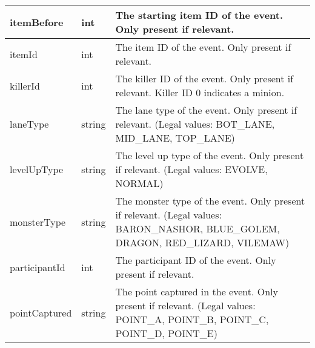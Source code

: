 \begin{table}[!htb]
\begin{tabular}{|llp{5cm}|}
itemBefore              & int                & The starting item ID of the event. Only present if relevant.                                                                                                                                                                                \\ \hline
itemId                  & int                & The item ID of the event. Only present if relevant.                                                                                                                                                                                         \\ \hline
killerId                & int                & The killer ID of the event. Only present if relevant. Killer ID 0 indicates a minion.                                                                                                                                                       \\ \hline
laneType                & string             & The lane type of the event. Only present if relevant. (Legal values: BOT\_LANE, MID\_LANE, TOP\_LANE)                                                                                                                                       \\ \hline
levelUpType             & string             & The level up type of the event. Only present if relevant. (Legal values: EVOLVE, NORMAL)                                                                                                                                                    \\ \hline
monsterType             & string             & The monster type of the event. Only present if relevant. (Legal values: BARON\_NASHOR, BLUE\_GOLEM, DRAGON, RED\_LIZARD, VILEMAW)                                                                                                           \\ \hline
participantId           & int                & The participant ID of the event. Only present if relevant.                                                                                                                                                                                  \\ \hline
pointCaptured           & string             & The point captured in the event. Only present if relevant. (Legal values: POINT\_A, POINT\_B, POINT\_C, POINT\_D, POINT\_E)                                                                                                                 \\ \hline

\end{tabular}
\end{table}
